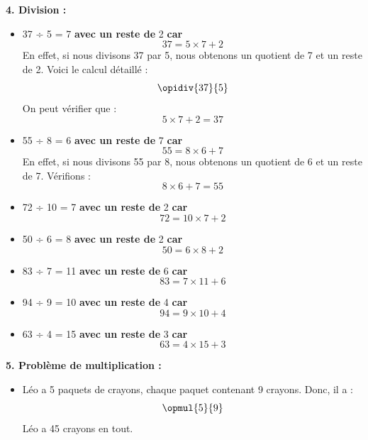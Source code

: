 \documentclass{article}
\begin{document}
\begin{tcolorbox}[colback=green!10!white, colframe=green!75!black, sharp corners=south, boxrule=0.8mm, title=Corrections]

   \textbf{4. Division :}
\begin{itemize}
\item 37 ÷ 5 = 7 \textbf{ avec un reste de } 2 \textbf{ car } 
    \[
    37 = 5 \times 7 + 2
    \]
    En effet, si nous divisons 37 par 5, nous obtenons un quotient de 7 et un reste de 2. Voici le calcul détaillé :
    \[
    \opidiv{37}{5}
    \]
    On peut vérifier que :
    \[
    5 \times 7 + 2 = 37
    \]
    \item 55 ÷ 8 = 6 \textbf{ avec un reste de } 7 \textbf{ car } 
    \[
    55 = 8 \times 6 + 7
    \]
    En effet, si nous divisons 55 par 8, nous obtenons un quotient de 6 et un reste de 7. Vérifions :
    \[
    8 \times 6 + 7 = 55
    \]
    \item 72 ÷ 10 = 7 \textbf{ avec un reste de } 2 \textbf{ car }
    \[
    72 = 10 \times 7 + 2
    \]
    \item 50 ÷ 6 = 8 \textbf{ avec un reste de } 2 \textbf{ car }
    \[
    50 = 6 \times 8 + 2
    \]
    \item 83 ÷ 7 = 11 \textbf{ avec un reste de } 6 \textbf{ car }
    \[
    83 = 7 \times 11 + 6
    \]
    \item 94 ÷ 9 = 10 \textbf{ avec un reste de } 4 \textbf{ car }
    \[
    94 = 9 \times 10 + 4
    \]
    \item 63 ÷ 4 = 15 \textbf{ avec un reste de } 3 \textbf{ car }
    \[
    63 = 4 \times 15 + 3
    \]
\end{itemize}


    \textbf{5. Problème de multiplication :}
    \begin{itemize}
        \item Léo a 5 paquets de crayons, chaque paquet contenant 9 crayons. Donc, il a :
        \[
        \opmul{5}{9} 
        \]
        Léo a 45 crayons en tout.
    \end{itemize}
\end{tcolorbox}
\end{document}

